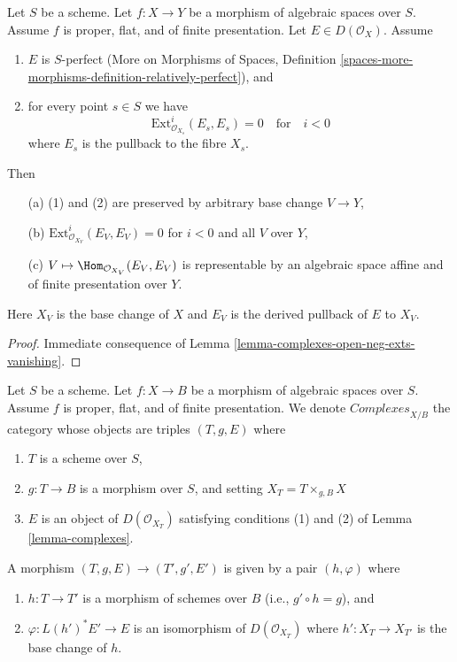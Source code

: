 \begin{lemma}
\label{lemma-complexes}
Let $S$ be a scheme. Let $f : X \to Y$ be a morphism of algebraic
spaces over $S$. Assume $f$ is proper, flat, and of finite presentation.
Let $E \in D(\mathcal{O}_X)$.
Assume
\begin{enumerate}
\item $E$ is $S$-perfect (More on Morphisms of Spaces, Definition
\ref{spaces-more-morphisms-definition-relatively-perfect}), and
\item for every point $s \in S$ we have
$$
\text{Ext}^i_{\mathcal{O}_{X_s}}(E_s, E_s) = 0
\quad\text{for}\quad i < 0
$$
where $E_s$ is the pullback to the fibre $X_s$.
\end{enumerate}
Then
\begin{enumerate}
\item[(a)] (1) and (2) are preserved by arbitrary base change $V \to Y$,
\item[(b)] $\text{Ext}^i_{\mathcal{O}_{X_V}}(E_V, E_V) = 0$ for $i < 0$
and all $V$ over $Y$,
\item[(c)] $V \mapsto \Hom_{\mathcal{O}_{X_V}}(E_V, E_V)$ is representable
by an algebraic space affine and of finite presentation over $Y$.
\end{enumerate}
Here $X_V$ is the base change of $X$ and $E_V$ is the derived pullback
of $E$ to $X_V$.
\end{lemma}

\begin{proof}
Immediate consequence of Lemma \ref{lemma-complexes-open-neg-exts-vanishing}.
\end{proof}

\begin{situation}
\label{situation-complexes}
Let $S$ be a scheme. Let $f : X \to B$ be a morphism of algebraic spaces
over $S$. Assume $f$ is proper, flat, and of finite presentation.
We denote $\textit{Complexes}_{X/B}$ the category whose objects are
triples $(T, g, E)$ where
\begin{enumerate}
\item $T$ is a scheme over $S$,
\item $g : T \to B$ is a morphism over $S$, and setting
$X_T = T \times_{g, B} X$
\item $E$ is an object of $D(\mathcal{O}_{X_T})$ satisfying
conditions (1) and (2) of Lemma \ref{lemma-complexes}.
\end{enumerate}
A morphism $(T, g, E) \to (T', g', E')$
is given by a pair $(h, \varphi)$ where
\begin{enumerate}
\item $h : T \to T'$ is a morphism of schemes over $B$
(i.e., $g' \circ h = g$), and
\item $\varphi : L(h')^*E' \to E$ is an
isomorphism of $D(\mathcal{O}_{X_T})$ where $h' : X_T \to X_{T'}$
is the base change of $h$.
\end{enumerate}
\end{situation}

